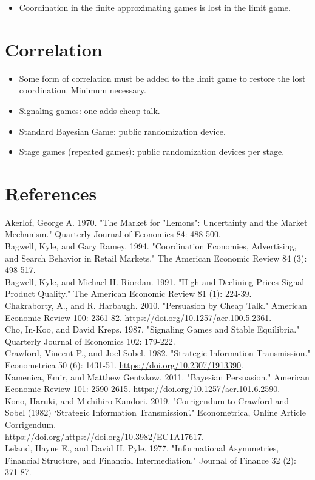 \documentclass[10pt]{article}
\begin{document}
\begin{itemize}
  \item Coordination in the finite approximating games is lost in the limit game.
\end{itemize}

\section*{Correlation}
\begin{itemize}
  \item Some form of correlation must be added to the limit game to restore the lost coordination. Minimum necessary.
  \item Signaling games: one adds cheap talk.
  \item Standard Bayesian Game: public randomization device.
  \item Stage games (repeated games): public randomization devices per stage.
\end{itemize}

\section*{References}
Akerlof, George A. 1970. "The Market for "Lemons": Uncertainty and the Market Mechanism." Quarterly Journal of Economics 84: 488-500.\\
Bagwell, Kyle, and Gary Ramey. 1994. "Coordination Economies, Advertising, and Search Behavior in Retail Markets." The American Economic Review 84 (3): 498-517.\\
Bagwell, Kyle, and Michael H. Riordan. 1991. "High and Declining Prices Signal Product Quality." The American Economic Review 81 (1): 224-39.\\
Chakraborty, A., and R. Harbaugh. 2010. "Persuasion by Cheap Talk." American Economic Review 100: 2361-82. \href{https://doi.org/10.1257/aer.100.5.2361}{https://doi.org/10.1257/aer.100.5.2361}.\\
Cho, In-Koo, and David Kreps. 1987. "Signaling Games and Stable Equilibria." Quarterly Journal of Economics 102: 179-222.\\
Crawford, Vincent P., and Joel Sobel. 1982. "Strategic Information Transmission." Econometrica 50 (6): 1431-51. \href{https://doi.org/10.2307/1913390}{https://doi.org/10.2307/1913390}.\\
Kamenica, Emir, and Matthew Gentzkow. 2011. "Bayesian Persuasion." American Economic Review 101: 2590-2615. \href{https://doi.org/10.1257/aer.101.6.2590}{https://doi.org/10.1257/aer.101.6.2590}.\\
Kono, Haruki, and Michihiro Kandori. 2019. "Corrigendum to Crawford and Sobel (1982) ‘Strategic Information Transmission'." Econometrica, Online Article Corrigendum.\\
\href{https://doi.org/https://doi.org/10.3982/ECTA17617}{https://doi.org/https://doi.org/10.3982/ECTA17617}.\\
Leland, Hayne E., and David H. Pyle. 1977. "Informational Asymmetries, Financial Structure, and Financial Intermediation." Journal of Finance 32 (2): 371-87.
\end{document}
